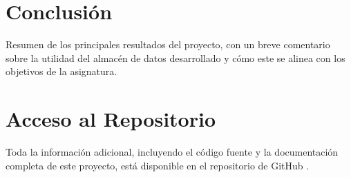 \documentclass{article}
\begin{document}
\section{Conclusión}
\label{sec:conclusion}
Resumen de los principales resultados del proyecto, con un breve comentario sobre la utilidad del almacén de datos desarrollado y cómo este se alinea con los objetivos de la asignatura.


\newpage
\section{Acceso al Repositorio}

Toda la información adicional, incluyendo el código fuente y la documentación completa de este proyecto, está disponible en el repositorio de GitHub \cite{silva2024github}.

\end{document}
